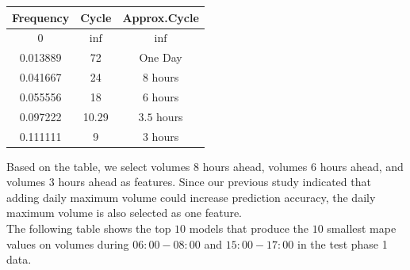 \documentclass[journal, letterpaper]{IEEEtran}
\begin{document}
\begin{table}[ht]
\centering %
\begin{tabular}{c| c| c } %
\hline\hline %
Frequency & Cycle & Approx.Cycle \\ %
\hline %
0 & $\inf$ & $\inf$ \\
\hline
0.013889 & 72 & One Day   \\ %
\hline
0.041667 & 24 & $8$ hours \\
\hline
0.055556 & 18 & $6$ hours \\
\hline
0.097222 & 10.29 & $3.5$ hours\\
\hline
0.111111 & 9 & $3$ hours \\
\hline
\hline %
\end{tabular}
\label{table:nonlin} %
\end{table}

Based on the table, we select volumes $8$ hours ahead, volumes $6$ hours ahead, and volumes $3$ hours ahead as features. Since our previous study indicated that adding daily maximum volume could increase prediction accuracy, the daily maximum volume is also selected as one feature.\\ 

The following table shows the top $10$ models that produce the $10$ smallest mape values on volumes during $06:00-08:00$ and $15:00-17:00$ in the test phase 1 data.
\end{document}
